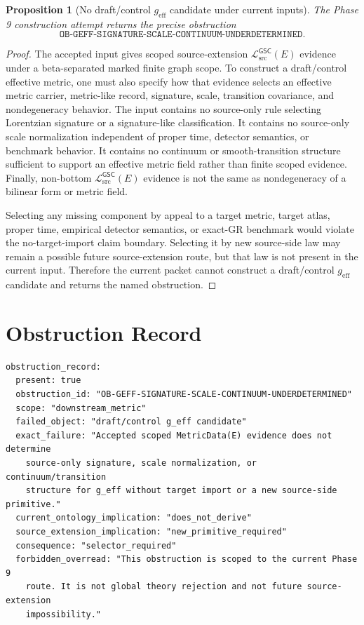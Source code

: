 \documentclass[11pt]{article}
\newcommand{\MetricData}{\mathcal{L}_{\mathrm{src}}^{\mathsf{GSC}}}
\newcommand{\geff}{g_{\mathrm{eff}}}
\newtheorem{proposition}{Proposition}
\begin{document}
\begin{proposition}[No draft/control \(\geff\) candidate under current inputs]
The Phase 9 construction attempt returns the precise obstruction
\[
  \texttt{OB-GEFF-SIGNATURE-SCALE-CONTINUUM-UNDERDETERMINED}.
\]
\end{proposition}

\begin{proof}
The accepted input gives scoped source-extension \(\MetricData(E)\) evidence
under a beta-separated marked finite graph scope. To construct a
draft/control effective metric, one must also specify how that evidence
selects an effective metric carrier, metric-like record, signature, scale,
transition covariance, and nondegeneracy behavior. The input contains no
source-only rule selecting Lorentzian signature or a signature-like
classification. It contains no source-only scale normalization independent of
proper time, detector semantics, or benchmark behavior. It contains no
continuum or smooth-transition structure sufficient to support an effective
metric field rather than finite scoped evidence. Finally, non-bottom
\(\MetricData(E)\) evidence is not the same as nondegeneracy of a bilinear
form or metric field.

Selecting any missing component by appeal to a target metric, target atlas,
proper time, empirical detector semantics, or exact-GR benchmark would violate
the no-target-import claim boundary. Selecting it by new source-side law may
remain a possible future source-extension route, but that law is not present
in the current input. Therefore the current packet cannot construct a
draft/control \(\geff\) candidate and returns the named obstruction.
\end{proof}

\section{Obstruction Record}

\begin{verbatim}
obstruction_record:
  present: true
  obstruction_id: "OB-GEFF-SIGNATURE-SCALE-CONTINUUM-UNDERDETERMINED"
  scope: "downstream_metric"
  failed_object: "draft/control g_eff candidate"
  exact_failure: "Accepted scoped MetricData(E) evidence does not determine
    source-only signature, scale normalization, or continuum/transition
    structure for g_eff without target import or a new source-side primitive."
  current_ontology_implication: "does_not_derive"
  source_extension_implication: "new_primitive_required"
  consequence: "selector_required"
  forbidden_overread: "This obstruction is scoped to the current Phase 9
    route. It is not global theory rejection and not future source-extension
    impossibility."
\end{verbatim}
\end{document}
